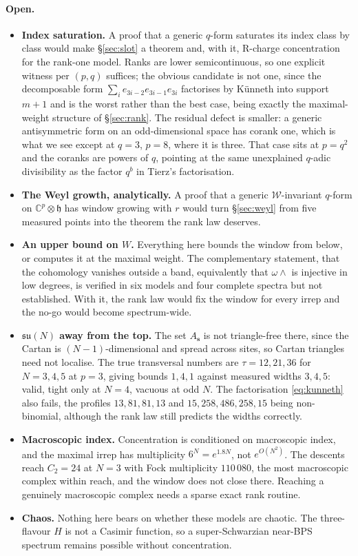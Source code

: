 \documentclass[10pt]{article}
\newcommand{\su}{\mathfrak{su}}
\newcommand{\h}{\mathfrak{h}}
\newcommand{\Wg}{\mathcal{W}}
\begin{document}
\paragraph{Open.}
\begin{itemize}
\item \textbf{Index saturation.} A proof that a generic $q$-form saturates its index class by class would make
\S\ref{sec:slot} a theorem and, with it, R-charge concentration for the rank-one model. Ranks are lower
semicontinuous, so one explicit witness per $(p,q)$ suffices; the obvious candidate is not one, since the
decomposable form $\sum_ie_{3i-2}e_{3i-1}e_{3i}$ factorises by K\"unneth into support $m+1$ and is the worst
rather than the best case, being exactly the maximal-weight structure of \S\ref{sec:rank}. The residual defect
is smaller: a generic antisymmetric form on an odd-dimensional space has corank one, which is what we see except
at $q=3$, $p=8$, where it is three. That case sits at $p=q^2$ and the coranks are powers of $q$, pointing at the
same unexplained $q$-adic divisibility as the factor $q^{b}$ in Tierz's factorisation.
\item \textbf{The Weyl growth, analytically.} A proof that a generic $\Wg$-invariant $q$-form on
$\mathbb C^p\otimes\h$ has window growing with $r$ would turn \S\ref{sec:weyl} from five measured points into
the theorem the rank law deserves.
\item \textbf{An upper bound on $W$.} Everything here bounds the window from below, or computes it at the maximal
weight. The complementary statement, that the cohomology vanishes outside a band, equivalently that
$\omega\wedge$ is injective in low degrees, is verified in six models and four complete spectra but not
established. With it, the rank law would fix the window for every irrep and the no-go would become
spectrum-wide.
\item \textbf{$\su(N)$ away from the top.} The set $A_{\mathbf s}$ is not triangle-free there, since the Cartan
is $(N-1)$-dimensional and spread across sites, so Cartan triangles need not localise. The true transversal
numbers are $\tau=12,21,36$ for $N=3,4,5$ at $p=3$, giving bounds $1,4,1$ against measured widths $3,4,5$: valid,
tight only at $N=4$, vacuous at odd $N$. The factorisation \eqref{eq:kunneth} also fails, the profiles
$13,81,81,13$ and $15,258,486,258,15$ being non-binomial, although the rank law still predicts the widths
correctly.
\item \textbf{Macroscopic index.} Concentration is conditioned on macroscopic index, and the maximal irrep has
multiplicity $6^N=e^{1.8N}$, not $e^{O(N^2)}$. The descents reach $C_2=24$ at $N=3$ with Fock multiplicity
$110\,080$, the most macroscopic complex within reach, and the window does not close there. Reaching a genuinely
macroscopic complex needs a sparse exact rank routine.
\item \textbf{Chaos.} Nothing here bears on whether these models are chaotic. The three-flavour $H$ is not a
Casimir function, so a super-Schwarzian near-BPS spectrum remains possible without concentration.
\end{itemize}
\end{document}
